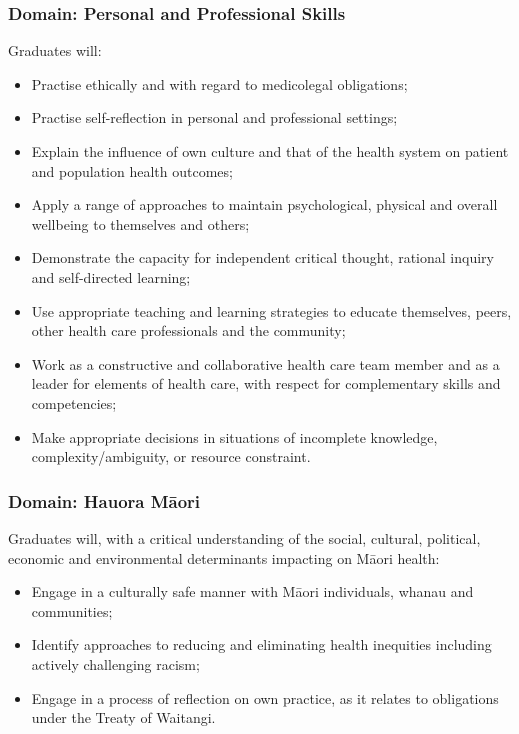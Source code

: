 \documentclass[11pt,fleqn]{book} %
\begin{document}
\subsubsection{Domain: Personal and Professional Skills}
Graduates will:
\begin{itemize}
\item Practise ethically and with regard to medicolegal obligations;
\item Practise self-reflection in personal and professional settings; 
\item Explain the influence of own culture and that of the health system on patient and population health outcomes;
\item Apply a range of approaches to maintain psychological, physical and overall wellbeing to themselves and others;
\item Demonstrate the capacity for independent critical thought, rational inquiry and self-directed learning;
\item Use appropriate teaching and learning strategies to educate themselves, peers, other health care professionals and the community;
\item Work as a constructive and collaborative health care team member and as a leader for elements of health care, with respect for complementary skills and competencies;
\item Make appropriate decisions in situations of incomplete knowledge, complexity/ambiguity, or resource constraint.
\end{itemize}


\subsubsection{Domain: Hauora M\={a}ori }
Graduates will, with a critical understanding of the social, cultural, political, economic and environmental determinants impacting on M\={a}ori  health:
\begin{itemize}
\item Engage in a culturally safe manner with M\={a}ori  individuals, whanau and communities;
\item Identify approaches to reducing and eliminating health inequities including actively challenging racism;
\item Engage in a process of reflection on own practice, as it relates to obligations under the Treaty of Waitangi.
\end{itemize}
\end{document}
